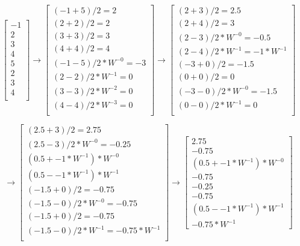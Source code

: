 \documentclass[11pt]{article}
\begin{document}
\[
\begin{bmatrix}
  -1 \\
  2 \\
  3 \\
  4 \\
  5 \\
  2 \\
  3 \\
  4 \\
\end{bmatrix}
\xrightarrow{}
\begin{bmatrix}
  (-1 + 5) / 2 = 2 \\
  (2 + 2) / 2 = 2 \\
  (3 + 3) / 2 = 3 \\
  (4 + 4) / 2 = 4 \\
  (-1 - 5) / 2 * W^{-0} = -3 \\
  (2 - 2) / 2 * W^{-1} = 0 \\
  (3 - 3) / 2 * W^{-2} = 0 \\
  (4 - 4) / 2 * W^{-3} = 0 \\
\end{bmatrix}
\xrightarrow{}
\begin{bmatrix}
  (2 + 3) / 2 = 2.5 \\
  (2 + 4) / 2 = 3 \\
  (2 - 3) / 2 * W^{-0} = -0.5 \\
  (2 - 4) / 2 * W^{-1} = -1 * W^{-1} \\
  (-3 + 0) / 2 = -1.5 \\
  (0 + 0) / 2 = 0 \\
  (-3 - 0) / 2 * W^{-0} = -1.5 \\
  (0 - 0) / 2 * W^{-1} = 0 \\
\end{bmatrix}
\]

\[
  \xrightarrow{}
  \begin{bmatrix}
    (2.5 + 3) / 2 = 2.75 \\
    (2.5 - 3) / 2 * W^{-0} = -0.25 \\
    (0.5 + -1 * W^{-1}) * W^{-0} \\
    (0.5 - -1 * W^{-1}) * W^{-1} \\
    (-1.5 + 0) / 2 = -0.75 \\
    (-1.5 - 0) / 2 * W^{-0} = -0.75 \\
    (-1.5 + 0) / 2 = -0.75 \\
    (-1.5 - 0) / 2 * W^{-1} = -0.75 * W^{-1} \\
  \end{bmatrix}
  \xrightarrow{}
  \begin{bmatrix}
    2.75 \\
    -0.75 \\
    (0.5 + -1 * W^{-1}) * W^{-0} \\
    -0.75 \\
    -0.25 \\
    -0.75 \\
    (0.5 - -1 * W^{-1}) * W^{-1} \\
    -0.75 * W^{-1}
  \end{bmatrix}
\]
\end{document}
